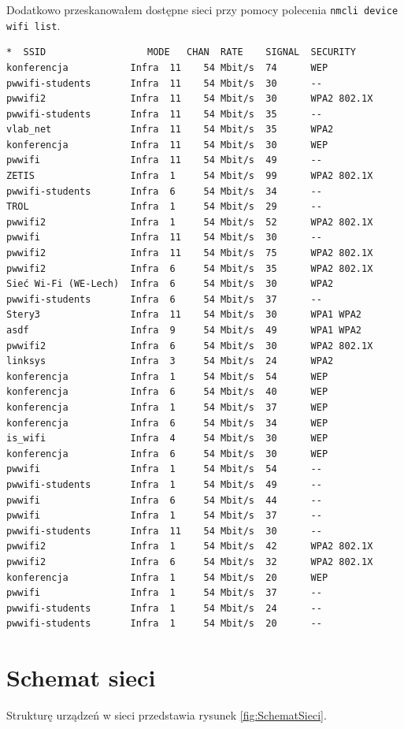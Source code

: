 \documentclass{article} %
\begin{document}
Dodatkowo przeskanowałem dostępne sieci przy pomocy polecenia \texttt{nmcli device wifi list}.

\footnotesize
\begin{verbatim}
*  SSID                  MODE   CHAN  RATE    SIGNAL  SECURITY
konferencja           Infra  11    54 Mbit/s  74      WEP
pwwifi-students       Infra  11    54 Mbit/s  30      --
pwwifi2               Infra  11    54 Mbit/s  30      WPA2 802.1X
pwwifi-students       Infra  11    54 Mbit/s  35      --
vlab_net              Infra  11    54 Mbit/s  35      WPA2
konferencja           Infra  11    54 Mbit/s  30      WEP
pwwifi                Infra  11    54 Mbit/s  49      --
ZETIS                 Infra  1     54 Mbit/s  99      WPA2 802.1X
pwwifi-students       Infra  6     54 Mbit/s  34      --
TROL                  Infra  1     54 Mbit/s  29      --
pwwifi2               Infra  1     54 Mbit/s  52      WPA2 802.1X
pwwifi                Infra  11    54 Mbit/s  30      --
pwwifi2               Infra  11    54 Mbit/s  75      WPA2 802.1X
pwwifi2               Infra  6     54 Mbit/s  35      WPA2 802.1X
Sieć Wi-Fi (WE-Lech)  Infra  6     54 Mbit/s  30      WPA2
pwwifi-students       Infra  6     54 Mbit/s  37      --
Stery3                Infra  11    54 Mbit/s  30      WPA1 WPA2
asdf                  Infra  9     54 Mbit/s  49      WPA1 WPA2
pwwifi2               Infra  6     54 Mbit/s  30      WPA2 802.1X
linksys               Infra  3     54 Mbit/s  24      WPA2
konferencja           Infra  1     54 Mbit/s  54      WEP
konferencja           Infra  6     54 Mbit/s  40      WEP
konferencja           Infra  1     54 Mbit/s  37      WEP
konferencja           Infra  6     54 Mbit/s  34      WEP
is_wifi               Infra  4     54 Mbit/s  30      WEP
konferencja           Infra  6     54 Mbit/s  30      WEP
pwwifi                Infra  1     54 Mbit/s  54      --
pwwifi-students       Infra  1     54 Mbit/s  49      --
pwwifi                Infra  6     54 Mbit/s  44      --
pwwifi                Infra  1     54 Mbit/s  37      --
pwwifi-students       Infra  11    54 Mbit/s  30      --
pwwifi2               Infra  1     54 Mbit/s  42      WPA2 802.1X
pwwifi2               Infra  6     54 Mbit/s  32      WPA2 802.1X
konferencja           Infra  1     54 Mbit/s  20      WEP
pwwifi                Infra  1     54 Mbit/s  37      --
pwwifi-students       Infra  1     54 Mbit/s  24      --
pwwifi-students       Infra  1     54 Mbit/s  20      --
\end{verbatim}
\normalsize

\section{Schemat sieci}
Strukturę urządzeń w sieci przedstawia rysunek \ref{fig:SchematSieci}.
\end{document}
